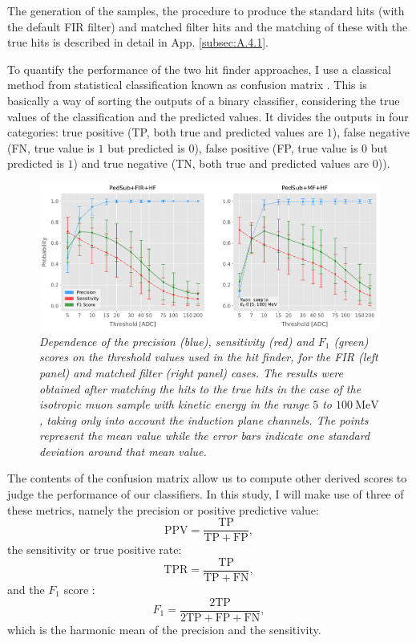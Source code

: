 The generation of the samples, the procedure to produce the standard hits (with the default FIR filter) and matched filter hits and the matching of these with the true hits is described in detail in App. \ref{subsec:A.4.1}.

To quantify the performance of the two hit finder approaches, I use a classical method from statistical classification known as confusion matrix \cite{Stehman1997}. This is basically a way of sorting the outputs of a binary classifier, considering the true values of the classification and the predicted values. It divides the outputs in four categories: true positive (TP, both true and predicted values are $1$), false negative (FN, true value is $1$ but predicted is $0$), false positive (FP, true value is $0$ but predicted is $1$) and true negative (TN, both true and predicted values are $0$)).

\begin{figure}[t]
	\centering
	\includegraphics[width=.99\linewidth]{Images/Matched_Filter/hit_study_muon_scores_indct}
	\caption{\textit{Dependence of the precision (blue), sensitivity (red) and $F_{1}$ (green) scores on the threshold values used in the hit finder, for the FIR (left panel) and matched filter (right panel) cases. The results were obtained after matching the hits to the true hits in the case of the isotropic muon sample with kinetic energy in the range $5$ to $100 \ \mathrm{MeV}$, taking only into account the induction plane channels. The points represent the mean value while the error bars indicate one standard deviation around that mean value.}}
	\label{fig:threshold_opt}
\end{figure}

The contents of the confusion matrix allow us to compute other derived scores to judge the performance of our classifiers. In this study, I will make use of three of these metrics, namely the precision or positive predictive value:
\begin{equation}
	\mathrm{PPV} = \frac{\mathrm{TP}}{\mathrm{TP} + \mathrm{FP}},
\end{equation}
the sensitivity or true positive rate:
\begin{equation}
	\mathrm{TPR} = \frac{\mathrm{TP}}{\mathrm{TP} + \mathrm{FN}},
\end{equation}
and the $F_{1}$ score \cite{Taha2015}:
\begin{equation}
	F_{1} = \frac{\mathrm{2 TP}}{2\mathrm{TP} + \mathrm{FP} + \mathrm{FN}},
\end{equation}
which is the harmonic mean of the precision and the sensitivity.

